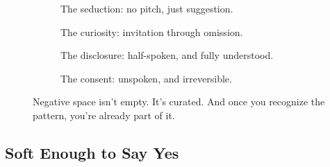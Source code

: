 \begin{figure}[H]
  \centering
  
  \begin{subfigure}[t]{0.45\textwidth}
  \centering
  \caption*{The seduction: no pitch, just suggestion.}
  \end{subfigure}
  \hfill
  \begin{subfigure}[t]{0.45\textwidth}
  \centering
  \caption*{The curiosity: invitation through omission.}
  \end{subfigure}
  
  \vspace{1em}
  
  \begin{subfigure}[t]{0.45\textwidth}
  \centering
  \caption*{The disclosure: half-spoken, and fully understood.}
  \end{subfigure}
  \hfill
  \begin{subfigure}[t]{0.45\textwidth}
  \centering
  \caption*{The consent: unspoken, and irreversible.}
  \end{subfigure}
  
  \caption*{Negative space isn’t empty. It’s curated. And once you recognize the pattern, you’re already part of it.}
\end{figure}

\medskip

\subsection{Soft Enough to Say Yes}

